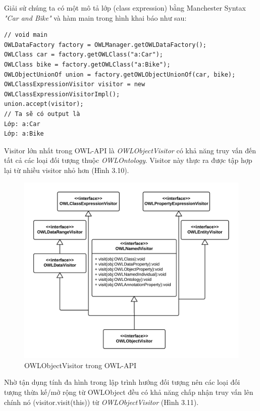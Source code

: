 {\let\thefootnote\relax{}
Giải sử chúng ta có một mô tả lớp (class expression) bằng Manchester Syntax \textit{"Car and Bike"} và hàm main trong hình khai báo như sau:
\begin{verbatim}
// void main 
OWLDataFactory factory = OWLManager.getOWLDataFactory();
OWLClass car = factory.getOWLClass("a:Car");
OWLClass bike = factory.getOWLClass("a:Bike");
OWLObjectUnionOf union = factory.getOWLObjectUnionOf(car, bike);
OWLClassExpressionVisitor visitor = new OWLClassExpressionVisitorImpl();
union.accept(visitor);
// Ta sẽ có output là 
Lớp: a:Car
Lớp: a:Bike                                       
\end{verbatim}
Visitor lớn nhất trong OWL-API là \textit{OWLObjectVisitor} có khả năng truy vấn đến tất cả các loại đối tượng thuộc \textit{OWLOntology}. Visitor này thực ra được tập hợp lại từ nhiều visitor nhỏ hơn (Hình 3.10).
\begin{figure}[h!]
	\centering
	\includegraphics[width=145mm]{Figures/uml_classdiagram_owlobjectvisitor_nobackground.png}
	\caption{OWLObjectVisitor trong OWL-API \label{overflow}}
\end{figure}
Nhờ tận dụng tính đa hình trong lập trình hướng đối tượng nên các loại đối tượng thừa kế/mở rộng từ OWLObject đều có khả năng chấp nhận truy vấn lên chính nó (visitor.visit(this)) từ \textit{OWLObjectVisitor} (Hình 3.11).
\begin{figure}[h!]

\end{figure}}
